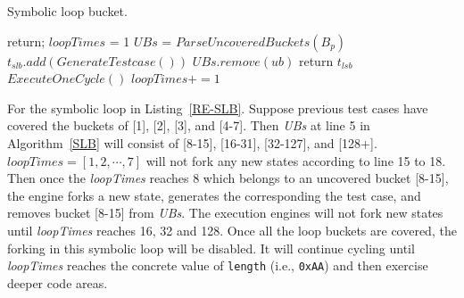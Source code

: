 \begin{algorithm}
  \LinesNumbered
  \caption{Symbolic loop bucket.}
  \label{SLB}
  {
    return;
  }
  $loopTimes$ = 1\;
  $UBs$ = $ParseUncoveredBuckets(B_p)$\;
  {
    {
      {
        $t_{slb}.add(GenerateTestcase())$\;
        $UBs$.$remove(ub)$\;
      }
    }
    {
      return $t_{lsb}$\;
    }{
      $ExecuteOneCycle()$\;
      $loopTimes += 1$\;
    }
  }
\end{algorithm}  

For the symbolic loop in Listing~\ref{RE-SLB}. Suppose previous test cases have covered the buckets of [1], [2], [3], and [4-7]. Then \textit{UBs} at line 5 in Algorithm~\ref{SLB} will consist of [8-15], [16-31], [32-127], and [128+]. $\textit{loopTimes}=[1, 2, \cdots, 7]$ will not fork any new states according to line 15 to 18. Then once the \textit{loopTimes} reaches 8 which belongs to an uncovered bucket [8-15], the engine forks a new state,  generates the corresponding the test case, and removes bucket [8-15] from \textit{UBs}. The execution engines will not fork new states until \textit{loopTimes} reaches 16, 32 and 128. Once all the loop buckets are covered, the forking in this symbolic loop will be disabled. It will continue cycling until \textit{loopTimes} reaches the concrete value of \texttt{length} (i.e., \texttt{0xAA}) and then exercise deeper code areas.
